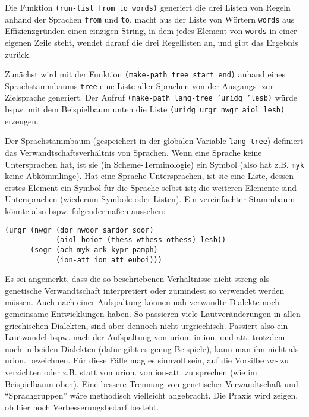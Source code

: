 \documentclass[12pt,a4paper,normalheadings,bibliography=totoc]{scrartcl}
\def\tt#1{\texttt{#1}}
\begin{document}
Die Funktion \tt{(run-list from to words)}
generiert die drei Listen von Regeln anhand der Sprachen \tt{from} und \tt{to},
macht aus der Liste von Wörtern \tt{words} aus Effizienzgründen einen
einzigen String,
in dem jedes Element von \tt{words} in einer eigenen Zeile steht,
wendet darauf die drei Regellisten an,
und gibt das Ergebnis zurück.

Zunächst wird mit der Funktion \tt{(make-path tree start end)} anhand
eines Sprachstammbaums \tt{tree}
eine Liste aller Sprachen von der Ausgangs- zur Zielsprache generiert.
Der Aufruf \tt{(make-path lang-tree 'uridg 'lesb)} würde bspw.
mit dem Beispielbaum unten die Liste \tt{(uridg urgr nwgr aiol lesb)} erzeugen.

Der Sprachstammbaum (gespeichert in der globalen Variable \tt{lang-tree})
definiert das Verwandtschaftsverhältnis von Sprachen.
Wenn eine Sprache keine Untersprachen hat,
ist sie (in Scheme-Terminologie) ein Symbol
(also hat z.B. \tt{myk} keine Abkömmlinge).
Hat eine Sprache Untersprachen,
ist sie eine Liste, dessen erstes Element ein Symbol für die Sprache selbst ist;
die weiteren Elemente sind Untersprachen (wiederum Symbole oder Listen).
Ein vereinfachter Stammbaum könnte also bspw. folgendermaßen aussehen:
\begin{verbatim}
(urgr (nwgr (dor nwdor sardor sdor)
            (aiol boiot (thess wthess othess) lesb))
      (sogr (ach myk ark kypr pamph)
            (ion-att ion att euboi)))
\end{verbatim}
Es sei angemerkt,
dass die so beschriebenen Verhältnisse nicht streng als genetische
Verwandtschaft interpretiert
oder zumindest so verwendet werden müssen.
Auch nach einer Aufspaltung können nah verwandte Dialekte
noch gemeinsame Entwicklungen haben.
So passieren viele Lautveränderungen in allen griechischen Dialekten,
sind aber dennoch nicht urgriechisch.
Passiert also ein Lautwandel bspw. nach der Aufspaltung
von urion. in ion. und att.
trotzdem noch in beiden Dialekten
(dafür gibt es genug Beispiele),
kann man ihn nicht als urion. bezeichnen.
Für diese Fälle mag es sinnvoll sein, auf die Vorsilbe \textit{ur-}
zu verzichten oder z.B. statt von urion. von ion-att.
zu sprechen (wie im Beispielbaum oben).
Eine bessere Trennung von genetischer Verwandtschaft und ``Sprachgruppen''
wäre methodisch vielleicht angebracht.
Die Praxis wird zeigen,
ob hier noch Verbesserungsbedarf besteht.
\end{document}

